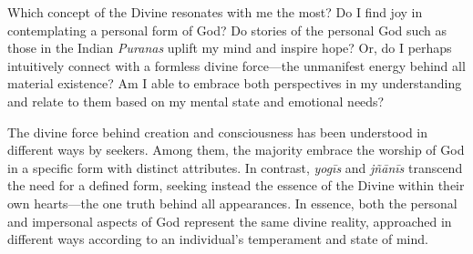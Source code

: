 
\newpage
\begin{mananam}{}
\normalfont\mananamtext Which concept of the Divine resonates with me the most? Do I find joy in contemplating a personal form of God? Do stories of the personal God such as those in the Indian \emph{Puranas} uplift my mind and inspire hope?
Or, do I perhaps intuitively connect with a formless divine force—the unmanifest energy behind all material existence? Am I able to embrace both perspectives in my understanding and relate to them based on my mental state and emotional needs?
\end{mananam}
\sreflect
\begin{inspiration}{}
\normalfont\mananamtext The divine force behind creation and consciousness has been understood in different ways by seekers. Among them, the majority embrace the worship of God in a specific form with distinct attributes. In contrast, \emph{yogīs} and \emph{jñānīs} transcend the need for a defined form, seeking instead the essence of the Divine within their own hearts—the one truth behind all appearances. 
In essence, both the personal and impersonal aspects of God represent the same divine reality, approached in different ways according to an individual's temperament and state of mind.
\end{inspiration}
\newpage

